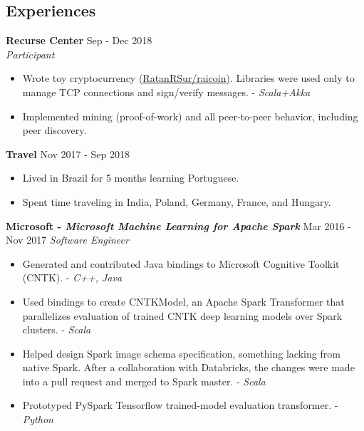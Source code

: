\documentclass[overlapped]{res}
\begin{document}

\address{\href{https://ratanrsur.github.io}{\underline{ratanrsur.github.io}} \\ \href{https://www.github.com/ratanrsur}{\underline{github.com/ratanrsur}}}
\address{\href{mailto:ratan.r.sur@gmail.com}{\underline{ratan.r.sur@gmail.com}} \\ \hfill (646) 410 - 6411}

\begin{resume}


    \section{Experiences}

    {\bf Recurse Center} \hfill Sep - Dec 2018 \\
    {\em Participant\/}
    \begin{itemize} \itemsep-2pt
        \item
            Wrote toy cryptocurrency (\href{https://www.github.com/ratanrsur/raicoin}{\underline{RatanRSur/raicoin}}).
            Libraries were used only to manage TCP connections and sign/verify messages. - {\em Scala+Akka}
        \item
            Implemented mining (proof-of-work) and all peer-to-peer behavior, including peer discovery.
    \end{itemize}

    {\bf Travel} \hfill Nov 2017 - Sep 2018
    \begin{itemize} \itemsep-2pt
        \item
            Lived in Brazil for 5 months learning Portuguese.
        \item
            Spent time traveling in India, Poland, Germany, France, and Hungary.
    \end{itemize}


    {\bf Microsoft - {\em Microsoft Machine Learning for Apache Spark}} \hfill Mar 2016 - Nov 2017
    {\em Software Engineer}
    \begin{itemize} \itemsep-2pt
        \item
            Generated and contributed Java bindings to Microsoft Cognitive Toolkit (CNTK). - {\em C++, Java}
        \item
            Used bindings to create CNTKModel, an Apache Spark Transformer that parallelizes evaluation of trained CNTK deep learning models over Spark clusters. - {\em Scala\/}
        \item
            Helped design Spark image schema specification, something lacking from native Spark.
            After a collaboration with Databricks, the changes were made into a pull request and merged to Spark master. - {\em Scala\/}
        \item
            Prototyped PySpark Tensorflow trained-model evaluation transformer. - {\em Python\/}
    \end{itemize}


\end{resume}
\end{document}

